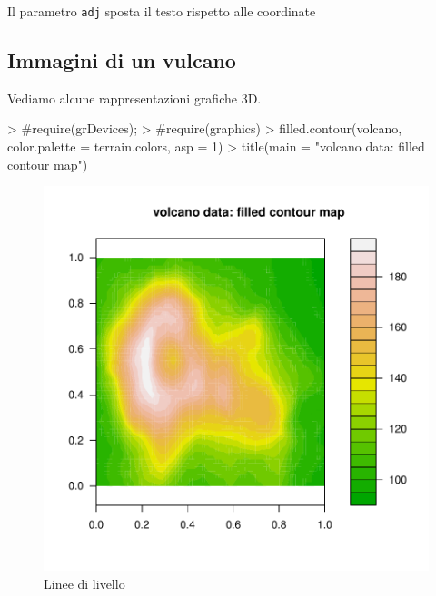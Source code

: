\documentclass[onecolumn,11pt]{book}
\begin{document}
Il parametro  \texttt{adj} sposta il testo rispetto alle coordinate  
\subsection{Immagini di un vulcano}
Vediamo alcune rappresentazioni grafiche 3D.
\begin{Schunk}
\begin{Sinput}
> #require(grDevices);
> #require(graphics)
> filled.contour(volcano, color.palette = terrain.colors, asp = 1)
> title(main = "volcano data: filled contour map")
\end{Sinput}
\end{Schunk}
\begin{figure}[htbp]
\begin{center}

\includegraphics{statisticaconR-352}
\caption{Linee di livello}
\label{vulcano1}
\end{center}
\end{figure}
 
\end{document}
